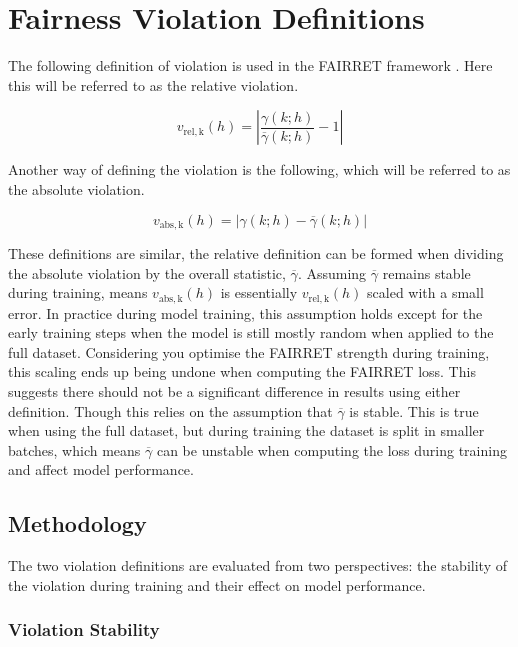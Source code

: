 \chapter{Fairness Violation Definitions}
The following definition of violation is used in the FAIRRET framework \cite{fairret}. Here this will be referred to as the relative violation.

\begin{equation}
    v_{\mathrm{rel, k}}(h)
    =
    \left|
    \frac{{\gamma}(k; h)}{\overline{{\gamma}}(k; h)} - 1
    \right|
    \label{eq}
\end{equation}

Another way of defining the violation is the following, which will be referred to as the absolute violation.

\begin{equation}
    v_{\mathrm{abs, k}}(h)
    =
    \left|
    \gamma(k; h) - \overline{{\gamma}}(k; h)
    \right|
    \label{eq}
\end{equation}

These definitions are similar, the relative definition can be formed when dividing the absolute violation by the overall statistic, $\overline{\gamma}$.
Assuming $\overline{\gamma}$ remains stable during training, means $v_{\mathrm{abs, k}}(h)$ is essentially $v_{\mathrm{rel, k}}(h)$ scaled with a small error. In practice during model training, this assumption holds except for the early training steps when the model is still mostly random when applied to the full dataset.
Considering you optimise the FAIRRET strength during training, this scaling ends up being undone when computing the FAIRRET loss. This suggests there should not be a significant difference in results using either definition. Though this relies on the assumption that $\overline{\gamma}$ is stable. This is true when using the full dataset, but during training the dataset is split in smaller batches, which means $\overline{\gamma}$ can be unstable when computing the loss during training and affect model performance.

\section{Methodology}

The two violation definitions are evaluated from two perspectives: the stability of the violation during training and their effect on model performance.

\subsection{Violation Stability}

